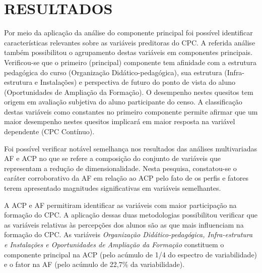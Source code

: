 
\section{RESULTADOS}

Por meio da aplicação da análise do componente principal foi possível identificar características relevantes sobre as variáveis preditoras do CPC. A referida análise também possibilitou o agrupamento destas variáveis em componentes principais. Verificou-se que o primeiro (principal) componente tem afinidade com a estrutura pedagógica do curso (Organização Didático-pedagógica), sua estrutura (Infra-estrutura e Instalações) e perspectiva de futuro do ponto de vista do aluno (Oportunidades de Ampliação da Formação). O desempenho nestes quesitos tem origem em avaliação subjetiva do aluno participante do censo. A classificação destas variáveis como constantes no primeiro componente permite afirmar que um maior desempenho nestes quesitos implicará em maior resposta na variável dependente (CPC Contínuo).

Foi possível verificar notável semelhança nos resultados das análises multivariadas AF e ACP no que se refere a composição do conjunto de variáveis que representam a redução de dimensionalidade. Nesta pesquisa, constatou-se o caráter corroborativo da AF em relação ao ACP pelo fato de os perfis e fatores terem apresentado magnitudes significativas em variáveis semelhantes.

A ACP e AF permitiram identificar as variáveis com maior participação na formação do CPC. A aplicação dessas duas metodologias possibilitou verificar que as variáveis relativas às percepções dos alunos são as que mais influenciam na formação do CPC. As variáveis \textit{Organização Didático-pedagógica, Infra-estrutura e Instalações e Oportunidades de Ampliação da Formação} constituem o componente principal na ACP (pelo acúmulo de 1/4 do espectro de variabilidade) e o fator na AF (pelo acúmulo de 22,7\% da variabilidade). 


